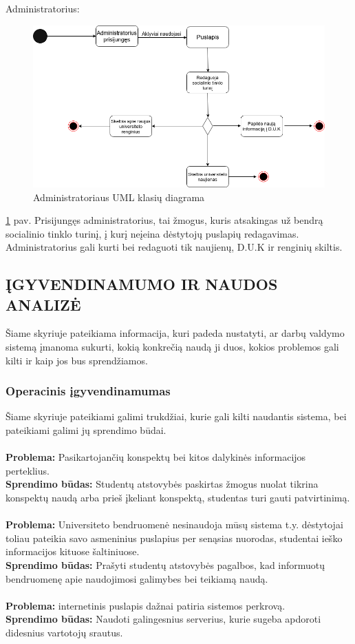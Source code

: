 \documentclass{VUMIFPSkursinis}
\begin{document}
Administratorius: \\
\begin{figure}[H]
\centering
\includegraphics[width=\linewidth]{img/administratorius.png}
\caption{Administratoriaus UML klasių diagrama}
\label{fig:administratoriu}
\end{figure}
\ref{fig:administratoriu} pav. Prisijungęs administratorius, tai žmogus, kuris atsakingas už bendrą socialinio tinklo turinį, į kurį neįeina dėstytojų puslapių redagavimas. Administratorius gali kurti bei redaguoti tik naujienų, D.U.K ir renginių skiltis.\\

\newpage
\subsection{ĮGYVENDINAMUMO IR NAUDOS ANALIZĖ}
Šiame skyriuje pateikiama informacija, kuri padeda nustatyti, ar darbų valdymo sistemą
įmanoma sukurti, kokią konkrečią naudą ji duos, kokios problemos gali kilti ir kaip jos bus sprendžiamos.

\subsubsection{Operacinis įgyvendinamumas}
Šiame skyriuje pateikiami galimi trukdžiai, kurie gali kilti naudantis sistema, bei pateikiami
galimi jų sprendimo būdai.\\
\\
\textbf{Problema:}
Pasikartojančių konspektų bei kitos dalykinės informacijos perteklius.
\\
\textbf{Sprendimo būdas:}
Studentų atstovybės paskirtas žmogus nuolat tikrina konspektų naudą arba prieš įkeliant konspektą, studentas turi gauti patvirtinimą.\\
\\
\textbf{Problema:}
Universiteto bendruomenė nesinaudoja mūsų sistema t.y. dėstytojai toliau pateikia savo asmeninius puslapius per senąsias nuorodas, studentai ieško informacijos kituose šaltiniuose.
\\
\textbf{Sprendimo būdas:}
Prašyti studentų atstovybės pagalbos, kad informuotų bendruomenę apie naudojimosi galimybes bei teikiamą naudą.\\
\\
\textbf{Problema:}
internetinis puslapis dažnai patiria sistemos perkrovą.
\\
\textbf{Sprendimo būdas:}
Naudoti galingesnius serverius, kurie sugeba apdoroti didesnius vartotojų srautus.
\end{document}
